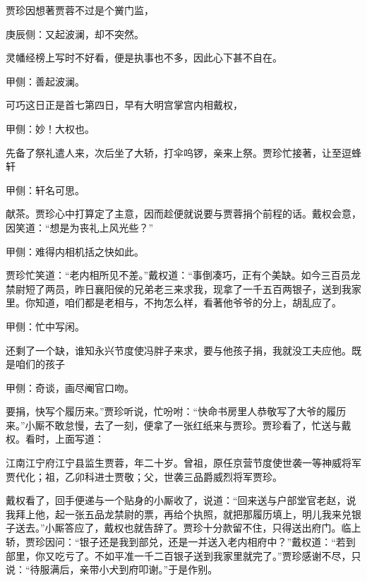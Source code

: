 \begin{parag}
    贾珍因想著贾蓉不过是个黉门监，\begin{note}庚辰侧：又起波澜，却不突然。\end{note}灵幡经榜上写时不好看，便是执事也不多，因此心下甚不自在。\begin{note}甲侧：善起波澜。\end{note}可巧这日正是首七第四日，早有大明宫掌宫内相戴权，\begin{note}甲侧：妙！大权也。\end{note}先备了祭礼遣人来，次后坐了大轿，打伞呜锣，亲来上祭。贾珍忙接著，让至逗蜂轩\begin{note}甲侧：轩名可思。\end{note}献茶。贾珍心中打算定了主意，因而趁便就说要与贾蓉捐个前程的话。戴权会意，因笑道：“想是为丧礼上风光些？”\begin{note}甲侧：难得内相机括之快如此。\end{note}贾珍忙笑道：“老内相所见不差。”戴权道：“事倒凑巧，正有个美缺。如今三百员龙禁尉短了两员，昨日襄阳侯的兄弟老三来求我，现拿了一千五百两银子，送到我家里。你知道，咱们都是老相与，不拘怎么样，看著他爷爷的分上，胡乱应了。\begin{note}甲侧：忙中写闲。\end{note}还剩了一个缺，谁知永兴节度使冯胖子来求，要与他孩子捐，我就没工夫应他。既是咱们的孩子\begin{note}甲侧：奇谈，画尽阉官口吻。\end{note}要捐，快写个履历来。”贾珍听说，忙吩咐：“快命书房里人恭敬写了大爷的履历来。”小厮不敢怠慢，去了一刻，便拿了一张红纸来与贾珍。贾珍看了，忙送与戴权。看时，上面写道：
\end{parag}


\begin{qute2sp}
    江南江宁府江宁县监生贾蓉，年二十岁。曾祖，原任京营节度使世袭一等神威将军贾代化；祖，乙卯科进士贾敬；父，世袭三品爵威烈将军贾珍。
\end{qute2sp}


\begin{parag}
    戴权看了，回手便递与一个贴身的小厮收了，说道：“回来送与户部堂官老赵，说我拜上他，起一张五品龙禁尉的票，再给个执照，就把那履历填上，明儿我来兑银子送去。”小厮答应了，戴权也就告辞了。贾珍十分款留不住，只得送出府门。临上轿，贾珍因问：“银子还是我到部兑，还是一并送入老内相府中？”戴权道：“若到部里，你又吃亏了。不如平准一千二百银子送到我家里就完了。”贾珍感谢不尽，只说：“待服满后，亲带小犬到府叩谢。”于是作别。
\end{parag}


